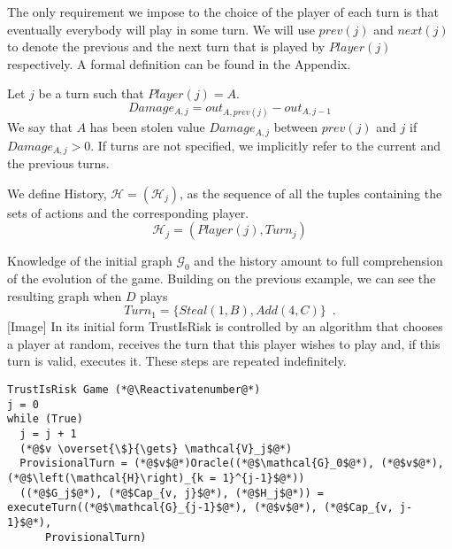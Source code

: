 \documentclass[11pt]{llncs}
\makeatletter
\newcommand*\Suppressnumber{%
  \lst@AddToHook{OnNewLine}{%
    \let\thelstnumber\relax%
     \advance\c@lstnumber-\@ne\relax%
    }%
}
\theoremstyle{definition}
\makeatother
\begin{document}
     The only requirement we impose to the choice of the player of each turn is that eventually everybody will play in some
     turn. We will use $prev\left(j\right)$ and $next\left(j\right)$ to denote the previous and the next turn that
     is played by $Player(j)$ respectively. A formal definition can be found in the Appendix.
     \begin{definition}[Damage]
        Let $j$ be a turn such that $Player\left(j\right) = A$.
        \begin{equation}
           Damage_{A, j} = out_{A, prev\left(j\right)} - out_{A, j-1}
        \end{equation}
        We say that $A$ has been stolen value $Damage_{A, j}$ between $prev\left(j\right)$ and $j$ if $Damage_{A, j} > 0$.
        If turns are not specified, we implicitly refer to the current and the previous turns.
     \end{definition}
     \begin{definition}[History]
        We define History, $\mathcal{H} = \left(\mathcal{H}_j\right)$, as the sequence of all the tuples containing the sets
        of actions and the corresponding player.
        \begin{equation}
           \mathcal{H}_j = \left(Player\left(j\right), Turn_j\right)
        \end{equation}
     \end{definition}
     Knowledge of the initial graph $\mathcal{G}_0$ and the history amount to full comprehension of the evolution of the
     game. Building on the previous example, we can see the resulting graph when $D$ plays
     \begin{equation}
        Turn_1 = \{Steal\left(1, B\right), Add\left(4, C\right)\} \enspace.
     \end{equation}
     [Image]
     In its initial form TrustIsRisk is controlled by an algorithm that chooses a player at random, receives the turn that
     this player wishes to play and, if this turn is valid, executes it. These steps are repeated indefinitely.
     \Suppressnumber
     \begin{lstlisting}[label=trustisriskgame, style=numbers]
TrustIsRisk Game (*@\Reactivatenumber@*)
j = 0
while (True)
  j = j + 1
  (*@$v \overset{\$}{\gets} \mathcal{V}_j$@*)
  ProvisionalTurn = (*@$v$@*)Oracle((*@$\mathcal{G}_0$@*), (*@$v$@*), (*@$\left(\mathcal{H}\right)_{k = 1}^{j-1}$@*))
  ((*@$G_j$@*), (*@$Cap_{v, j}$@*), (*@$H_j$@*)) = executeTurn((*@$\mathcal{G}_{j-1}$@*), (*@$v$@*), (*@$Cap_{v, j-1}$@*),
      ProvisionalTurn)
    \end{lstlisting}
\end{document}
